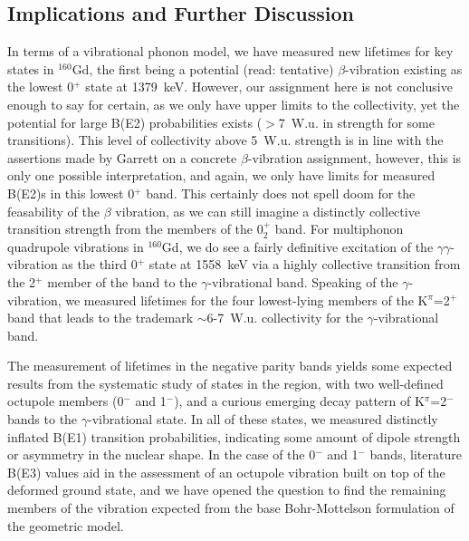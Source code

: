 \subsection{Implications and Further Discussion}

In terms of a vibrational phonon model, we have measured new lifetimes for key states in $^{160}$Gd, the first being a potential (read: tentative) $\beta$-vibration existing as the lowest 0$^+$ state at 1379~keV. However, our assignment here is not conclusive enough to say for certain, as we only have upper limits to the collectivity, yet the potential for large B(E2) probabilities exists ($>$7~W.u. in strength for some transitions). This level of collectivity above 5~W.u. strength is in line with the assertions made by Garrett \cite{Garrett_betavib2001} on a concrete $\beta$-vibration assignment, however, this is only one possible interpretation, and again, we only have limits for measured B(E2)s in this lowest 0$^+$ band. This certainly does not spell doom for the feasability of the $\beta$ vibration, as we can still imagine a distinctly collective transition strength from the members of the 0$^+_2$ band. For multiphonon quadrupole vibrations in $^{160}$Gd, we do see a fairly definitive excitation of the $\gamma\gamma$-vibration as the third 0$^+$ state at 1558~keV via a highly collective transition from the 2$^+$ member of the band to the $\gamma$-vibrational band. Speaking of the $\gamma$-vibration, we measured lifetimes for the four lowest-lying members of the K$^\pi$=2$^+$ band that leads to the trademark $\sim$6-7~W.u. collectivity for the $\gamma$-vibrational band. 

The measurement of lifetimes in the negative parity bands yields some expected results from the systematic study of states in the region, with two well-defined octupole members (0$^-$ and 1$^-$), and a curious emerging decay pattern of K$^\pi$=2$^-$ bands to the $\gamma$-vibrational state. In all of these states, we measured distinctly inflated B(E1) transition probabilities, indicating some amount of dipole strength or asymmetry in the nuclear shape. In the case of the 0$^-$ and 1$^-$ bands, literature B(E3) values aid in the assessment of an octupole vibration built on top of the deformed ground state, and we have opened the question to find the remaining members of the vibration expected from the base Bohr-Mottelson formulation of the geometric model. 

